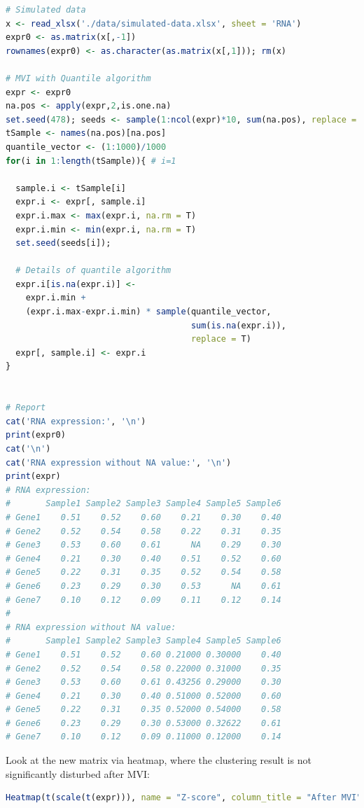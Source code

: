 \documentclass[
  12pt,
]{book}
\begin{document}
\begin{lstlisting}[language=R]
# Simulated data
x <- read_xlsx('./data/simulated-data.xlsx', sheet = 'RNA')
expr0 <- as.matrix(x[,-1])
rownames(expr0) <- as.character(as.matrix(x[,1])); rm(x)

# MVI with Quantile algorithm
expr <- expr0
na.pos <- apply(expr,2,is.one.na)
set.seed(478); seeds <- sample(1:ncol(expr)*10, sum(na.pos), replace = F)
tSample <- names(na.pos)[na.pos]
quantile_vector <- (1:1000)/1000
for(i in 1:length(tSample)){ # i=1
  
  sample.i <- tSample[i]
  expr.i <- expr[, sample.i]
  expr.i.max <- max(expr.i, na.rm = T)
  expr.i.min <- min(expr.i, na.rm = T)
  set.seed(seeds[i]);
  
  # Details of quantile algorithm
  expr.i[is.na(expr.i)] <-
    expr.i.min +
    (expr.i.max-expr.i.min) * sample(quantile_vector,
                                     sum(is.na(expr.i)),
                                     replace = T)
  expr[, sample.i] <- expr.i
}
  

# Report
cat('RNA expression:', '\n')
print(expr0)
cat('\n')
cat('RNA expression without NA value:', '\n')
print(expr)
# RNA expression: 
#       Sample1 Sample2 Sample3 Sample4 Sample5 Sample6
# Gene1    0.51    0.52    0.60    0.21    0.30    0.40
# Gene2    0.52    0.54    0.58    0.22    0.31    0.35
# Gene3    0.53    0.60    0.61      NA    0.29    0.30
# Gene4    0.21    0.30    0.40    0.51    0.52    0.60
# Gene5    0.22    0.31    0.35    0.52    0.54    0.58
# Gene6    0.23    0.29    0.30    0.53      NA    0.61
# Gene7    0.10    0.12    0.09    0.11    0.12    0.14
# 
# RNA expression without NA value: 
#       Sample1 Sample2 Sample3 Sample4 Sample5 Sample6
# Gene1    0.51    0.52    0.60 0.21000 0.30000    0.40
# Gene2    0.52    0.54    0.58 0.22000 0.31000    0.35
# Gene3    0.53    0.60    0.61 0.43256 0.29000    0.30
# Gene4    0.21    0.30    0.40 0.51000 0.52000    0.60
# Gene5    0.22    0.31    0.35 0.52000 0.54000    0.58
# Gene6    0.23    0.29    0.30 0.53000 0.32622    0.61
# Gene7    0.10    0.12    0.09 0.11000 0.12000    0.14
\end{lstlisting}

Look at the new matrix via heatmap, where the clustering result is not significantly disturbed after MVI:

\begin{lstlisting}[language=R]
Heatmap(t(scale(t(expr))), name = "Z-score", column_title = "After MVI")
\end{lstlisting}
\end{document}

